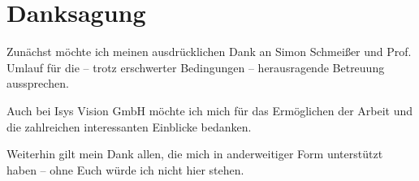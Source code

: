 \thispagestyle{plain}
\chapter*{Danksagung}
\label{ch:danksagung}

Zunächst möchte ich meinen ausdrücklichen Dank an Simon Schmeißer und Prof. Umlauf für die -- trotz erschwerter Bedingungen -- herausragende Betreuung aussprechen.

Auch bei Isys Vision GmbH möchte ich mich für das Ermöglichen der Arbeit und die zahlreichen interessanten Einblicke bedanken.

Weiterhin gilt mein Dank allen, die mich in anderweitiger Form unterstützt haben -- ohne Euch würde ich nicht hier stehen.